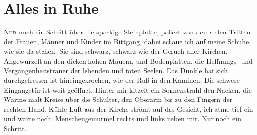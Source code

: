 \chapter{Alles in Ruhe}

\lettrine{N}{ur} noch ein Schritt über die speckige Steinplatte, poliert von den vielen Tritten der Frauen, Männer und Kinder im Bittgang, dabei schaue ich auf meine Schuhe, wie sie da stehen. Sie sind schwarz, schwarz wie der Geruch aller Kirchen. Angewurzelt an den dicken hohen Mauern, und Bodenplatten, die Hoffnungs- und Vergangenheitstrauer der lebenden und toten Seelen. Das Dunkle hat sich durchgefressen ist hineingekrochen, wie der Ruß in den Kaminen. Die schwere Eingangstür ist weit geöffnet. Hinter mir kitzelt ein Sonnenstrahl den Nacken, die Wärme malt Kreise über die Schulter, den Oberarm bis zu den Fingern der rechten Hand. Kühle Luft aus der Kirche strömt auf das Gesicht, ich atme tief ein und warte noch. Menschengemurmel rechts und links neben mir. Nur noch ein Schritt.\\\\
